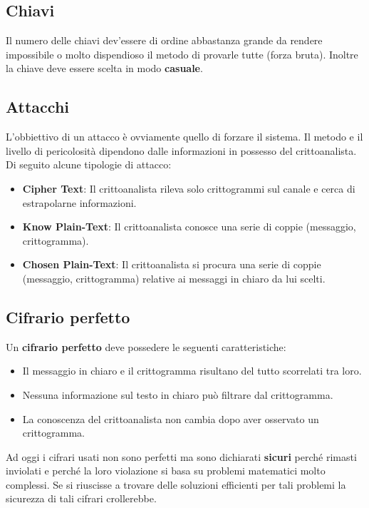 \subsection{Chiavi}
Il numero delle chiavi dev'essere di ordine abbastanza grande da rendere impossibile
o molto dispendioso il metodo di provarle tutte (forza bruta). Inoltre la chiave deve
essere scelta in modo \textbf{casuale}.

\subsection{Attacchi}
L'obbiettivo di un attacco \`e ovviamente quello di forzare il sistema. Il metodo e il
livello di pericolosit\`a dipendono dalle informazioni in possesso del crittoanalista.
Di seguito alcune tipologie di attacco:
\begin{itemize}
	\item \textbf{Cipher Text}: Il crittoanalista rileva solo crittogrammi sul
	      canale e cerca di estrapolarne informazioni.
	\item \textbf{Know Plain-Text}: Il crittoanalista conosce una serie di coppie
	      (messaggio, crittogramma).
	\item \textbf{Chosen Plain-Text}: Il crittoanalista si procura una serie di coppie
	      (messaggio, crittogramma) relative ai messaggi in chiaro da lui scelti.
\end{itemize}

\subsection{Cifrario perfetto}
Un \textbf{cifrario perfetto} deve possedere le seguenti caratteristiche:
\begin{itemize}
	\item Il messaggio in chiaro e il crittogramma risultano del tutto scorrelati tra
	      loro.
	\item Nessuna informazione sul testo in chiaro pu\`o filtrare dal crittogramma.
	\item La conoscenza del crittoanalista non cambia dopo aver osservato un
	      crittogramma.
\end{itemize}
Ad oggi i cifrari usati non sono perfetti ma sono dichiarati \textbf{sicuri} perch\'e
rimasti inviolati e perch\'e la loro violazione si basa su problemi matematici molto
complessi. Se si riuscisse a trovare delle soluzioni efficienti per tali problemi 
la sicurezza di tali cifrari crollerebbe.

